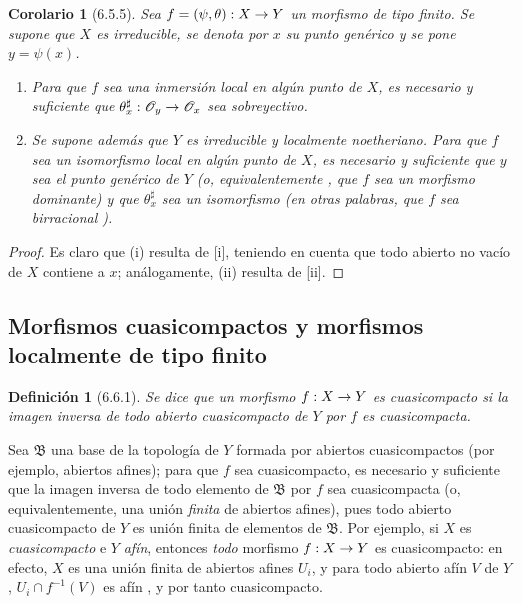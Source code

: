 \documentclass[oneside]{amsart}
\theoremstyle{ega-env-style}
\theoremstyle{ega-thm-env-style}
\newtheorem*{corollary}{Corolario}
\theoremstyle{ega-defn-env-style}
\newtheorem*{definition}{Definición}
\renewcommand{\to}{\mathchoice{\longrightarrow}{\rightarrow}{\rightarrow}{\rightarrow}}
\let\EGAOriginalLabel\label
\renewcommand{\label}[1]{\phantomsection\EGAOriginalLabel{#1}}
\begin{document}
\begin{corollary}[6.5.5]
\label{I.6.5.5}
Sea $f=(\psi,\theta):X\to Y$ un morfismo de tipo finito.
Se supone que $X$ es irreducible, se denota por $x$ su punto genérico y se pone $y=\psi(x)$.
\begin{enumerate}
  \item[{\rm(i)}] Para que $f$ sea una inmersión local en algún punto de $X$, es necesario y suficiente que $\theta_x^\sharp:\mathscr{O}_y\to\mathscr{O}_x$ sea sobreyectivo.
  \item[{\rm(ii)}] Se supone además que $Y$ es irreducible y localmente noetheriano.
    Para que $f$ sea un isomorfismo local en algún punto de $X$, es necesario y suficiente que $y$ sea el punto genérico de $Y$ \textup{(o, equivalentemente , que $f$ sea un morfismo \emph{dominante})} y que $\theta_x^\sharp$ sea un isomorfismo \textup{(en otras palabras, que $f$ sea \emph{birracional} )}.
\end{enumerate}
\end{corollary}

\begin{proof}
Es claro que (i) resulta de [i], teniendo en cuenta que todo abierto no vacío de $X$ contiene a $x$;
análogamente, (ii) resulta de [ii].
\end{proof}

\subsection{Morfismos cuasicompactos y morfismos localmente de tipo finito}
\label{subsection:I.6.6}

\begin{definition}[6.6.1]
\label{I.6.6.1}
{\itshape Se dice que un morfismo $f:X\to Y$ es cuasicompacto si la imagen inversa de todo abierto cuasicompacto de $Y$ por $f$ es cuasicompacta.}
\end{definition}

Sea $\mathfrak{B}$ una base de la topología de $Y$ formada por abiertos cuasicompactos (por ejemplo, abiertos afines);
para que $f$ sea cuasicompacto, es necesario y suficiente que la imagen inversa de todo elemento de $\mathfrak{B}$ por $f$ sea cuasicompacta (o, equivalentemente, una unión \emph{finita} de abiertos afines), pues todo abierto cuasicompacto de $Y$ es unión finita de elementos de $\mathfrak{B}$.
Por ejemplo, si $X$ es \emph{cuasicompacto} e $Y$ \emph{afín}, entonces \emph{todo} morfismo $f:X\to Y$ es cuasicompacto:
en efecto, $X$ es una unión finita de abiertos afines $U_i$, y para todo abierto afín $V$ de $Y$, $U_i\cap f^{-1}(V)$ es afín , y por tanto cuasicompacto.
\end{document}

